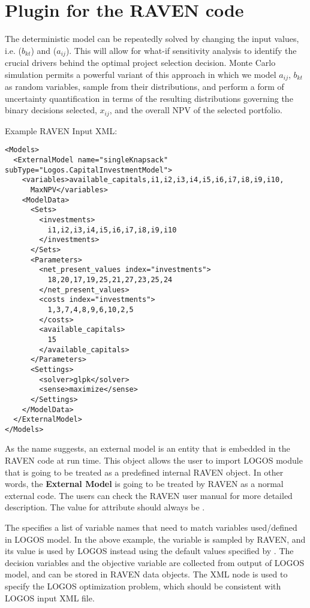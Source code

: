 \section{Plugin for the RAVEN code}
\label{sec:RavenPlugin}

The deterministic model can be repeatedly solved by changing the input values, i.e.
 ($b_{kt}$) and  ($a_{ij}$).
This will allow for what-if sensitivity analysis to identify the
crucial drivers behind the optimal project selection decision. Monte Carlo simulation permits a
powerful variant of this approach in which we model $a_{ij}$, $b_{kt}$ as random
variables, sample from their distributions, and perform a form of uncertainty quantification
in terms of the resulting distributions governing the binary decisions selected, $x_{ij}$, and
the overall NPV of the selected portfolio.

Example RAVEN Input  XML:
\begin{lstlisting}[style=XML]
<Models>
  <ExternalModel name="singleKnapsack" subType="Logos.CapitalInvestmentModel">
    <variables>available_capitals,i1,i2,i3,i4,i5,i6,i7,i8,i9,i10,
      MaxNPV</variables>
    <ModelData>
      <Sets>
        <investments>
          i1,i2,i3,i4,i5,i6,i7,i8,i9,i10
        </investments>
      </Sets>
      <Parameters>
        <net_present_values index="investments">
          18,20,17,19,25,21,27,23,25,24
        </net_present_values>
        <costs index="investments">
          1,3,7,4,8,9,6,10,2,5
        </costs>
        <available_capitals>
          15
        </available_capitals>
      </Parameters>
      <Settings>
        <solver>glpk</solver>
        <sense>maximize</sense>
      </Settings>
    </ModelData>
  </ExternalModel>
</Models>
\end{lstlisting}

As the name suggests, an external model is an entity that is embedded in the RAVEN
code at run time. This object allows the user to import LOGOS module that is going
to be treated as a predefined internal RAVEN object. In other words, the
\textbf{External Model} is going to be treated by RAVEN as a normal external code.
The users can check the RAVEN user manual for more detailed description.
\nb The value for attribute  should always be .

The  specifies a list of variable names that need to match
variables used/defined in LOGOS model. In the above example, the variable
 is sampled by RAVEN, and its value is used
by LOGOS instead using the default values specified by .
The decision variables  and the
objective variable  are collected from output of LOGOS model,
and can be stored in RAVEN data objects.
The XML node  is used to specify the LOGOS optimization problem, which
should be consistent with LOGOS input XML file.

